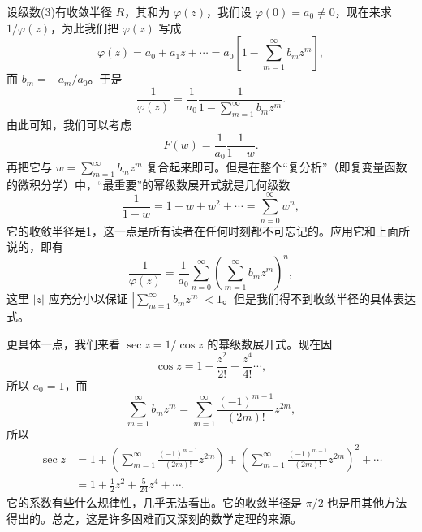 设级数(3)有收敛半径 $R$，其和为 $\varphi(z)$，我们设 $\varphi(0)=a_0\ne0$，现在来求 $1/\varphi(z)$，为此我们把 $\varphi(z)$ 写成
\[
 \varphi(z)=a_0+a_1z+\cdots=a_0\left[1-\sum_{m=1}^{\infty}b_mz^m\right],
\]
而 $b_m=-a_m/a_0$。于是
\[
 \frac1{\varphi(z)}=\frac1{a_0}\frac1{1-\sum_{m=1}^{\infty}b_mz^m}.
\]
由此可知，我们可以考虑
\begin{equation}
 F(w)=\frac1{a_0}\frac1{1-w}.
 \tag{9}
\end{equation}
再把它与 $w=\sum_{m=1}^{\infty}b_mz^m$ 复合起来即可。但是在整个“复分析”（即复变量函数的微积分学）中，“最重要”的幂级数展开式就是几何级数
\[
 \frac1{1-w}=1+w+w^2+\cdots=\sum_{n=0}^{\infty}w^n,
\]
它的收敛半径是1，这一点是所有读者在任何时刻都不可忘记的。应用它和上面所说的，即有
\[
 \frac1{\varphi(z)}=\frac1{a_0}\sum_{n=0}^{\infty}\left(\sum_{m=1}^{\infty}b_mz^m\right)^n,
\]
这里 $|z|$ 应充分小以保证 $\left|\sum_{m=1}^{\infty}b_mz^m\right|<1$。但是我们得不到收敛半径的具体表达式。

更具体一点，我们来看 $\sec z=1/\cos z$ 的幂级数展开式。现在因
\[
 \cos z=1-\frac{z^2}{2!}+\frac{z^4}{4!}\cdots,
\]
所以 $a_0=1$，而
\[
 \sum_{m=1}^{\infty}b_mz^m=\sum_{m=1}^{\infty}\frac{(-1)^{m-1}}{(2m)!}z^{2m},
\]
所以
\begin{align*}
 \sec z
 &=1+\left(\sum_{m=1}^{\infty}\frac{(-1)^{m-1}}{(2m)!}z^{2m}\right)
 +\left(\sum_{m=1}^{\infty}\frac{(-1)^{m-1}}{(2m)!}z^{2m}\right)^2+\cdots\\
 &=1+\frac12z^2+\frac5{24}z^4+\cdots.
\end{align*}
它的系数有些什么规律性，几乎无法看出。它的收敛半径是 $\pi/2$ 也是用其他方法得出的。总之，这是许多困难而又深刻的数学定理的来源。
